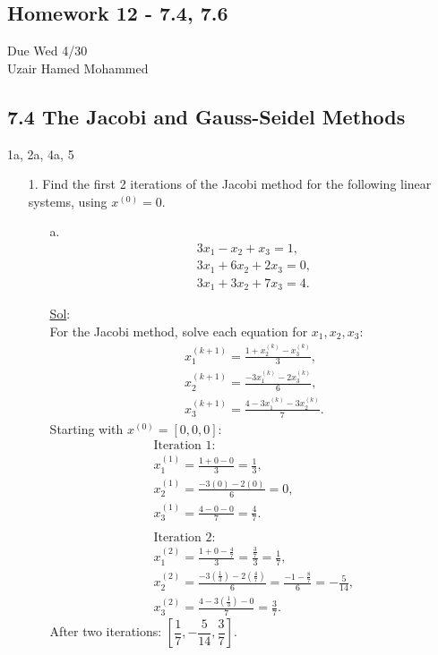 \begin{center}
  \section*{Homework 12 - 7.4, 7.6}
  Due Wed 4/30 \\
  Uzair Hamed Mohammed
\end{center}

\subsection*{7.4 The Jacobi and Gauss-Seidel Methods}

1a, 2a, 4a, 5

\begin{enumerate}
  \item[1.] Find the first 2 iterations of the Jacobi method for the
    following linear systems, using \(x^{(0)} = 0\).
    \begin{enumerate}
      \item[a.] \[
          \begin{array}{l}
            3x_1 - x_2 + x_3 = 1, \\
            3x_1 + 6x_2 + 2x_3 = 0, \\
            3x_1 + 3x_2 + 7x_3 = 4.
          \end{array}
        \]

        \underline{Sol}:\\
        For the Jacobi method, solve each equation for \(x_1, x_2, x_3\):
        \[
          \begin{array}{l}
            x_1^{(k+1)} = \frac{1 + x_2^{(k)} - x_3^{(k)}}{3}, \\
            x_2^{(k+1)} = \frac{-3x_1^{(k)} - 2x_3^{(k)}}{6}, \\
            x_3^{(k+1)} = \frac{4 - 3x_1^{(k)} - 3x_2^{(k)}}{7}.
          \end{array}
        \]
        Starting with \(x^{(0)} = [0, 0, 0]\):
        \[
          \begin{array}{l}
            \text{Iteration 1:} \\
            x_1^{(1)} = \frac{1 + 0 - 0}{3} = \frac{1}{3}, \\
            x_2^{(1)} = \frac{-3(0) - 2(0)}{6} = 0, \\
            x_3^{(1)} = \frac{4 - 0 - 0}{7} = \frac{4}{7}. \\
            \\
            \text{Iteration 2:} \\
            x_1^{(2)} = \frac{1 + 0 - \frac{4}{7}}{3} =
            \frac{\frac{3}{7}}{3} = \frac{1}{7}, \\
            x_2^{(2)} = \frac{-3\left(\frac{1}{3}\right) -
            2\left(\frac{4}{7}\right)}{6} = \frac{-1 -
            \frac{8}{7}}{6} = -\frac{5}{14}, \\
            x_3^{(2)} = \frac{4 - 3\left(\frac{1}{3}\right) - 0}{7} =
            \frac{3}{7}.
          \end{array}
        \]
        After two iterations: \(\boxed{\left[ \dfrac{1}{7},
        -\dfrac{5}{14}, \dfrac{3}{7} \right]}\).
    \end{enumerate}


\end{enumerate}
